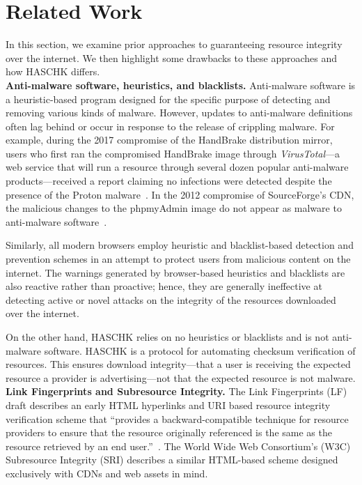 \section{Related Work} \label{sec:hc-related}

In this section, we examine prior approaches to guaranteeing resource integrity
over the internet. We then highlight some drawbacks to these approaches and how
HASCHK differs. \\

\noindent\textbf{Anti-malware software, heuristics, and blacklists.}
Anti-malware software is a heuristic-based program designed for the specific
purpose of detecting and removing various kinds of malware. However, updates to
anti-malware definitions often lag behind or occur in response to the release of
crippling malware. For example, during the 2017 compromise of the HandBrake
distribution mirror, users who first ran the compromised HandBrake image through
\textit{VirusTotal}---a web service that will run a resource through several
dozen popular anti-malware products---received a report claiming no infections
were detected despite the presence of the Proton malware~\cite{SCA-HB1}. In the
2012 compromise of SourceForge's CDN, the malicious changes to the phpmyAdmin
image do not appear as malware to anti-malware software~\cite{SCA-PMA1}.

Similarly, all modern browsers employ heuristic and blacklist-based detection
and prevention schemes in an attempt to protect users from malicious content on
the internet. The warnings generated by browser-based heuristics and blacklists
are also reactive rather than proactive; hence, they are generally ineffective
at detecting active or novel attacks on the integrity of the resources
downloaded over the internet.

On the other hand, HASCHK relies on no heuristics or blacklists and is not
anti-malware software. HASCHK is a protocol for automating checksum
verification of resources. This ensures download integrity---that a user is
receiving the expected resource a provider is advertising---not that the
expected resource is not malware. \\

\noindent\textbf{Link Fingerprints and Subresource Integrity.} The Link
Fingerprints (LF) draft describes an early HTML hyperlinks and URI based
resource integrity verification scheme that ``provides a backward-compatible
technique for resource providers to ensure that the resource originally
referenced is the same as the resource retrieved by an end user.''~\cite{LF}.
The World Wide Web Consortium's (W3C) Subresource Integrity (SRI) describes a
similar HTML-based scheme designed exclusively with CDNs and web assets in mind.

